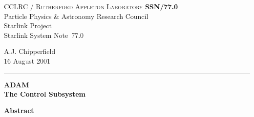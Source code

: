 \documentclass[twoside,11pt]{article}
\newcommand{\stardoccategory}  {Starlink System Note}
\newcommand{\stardocinitials}  {SSN}
\newcommand{\stardocnumber}    {77.0}
\newcommand{\stardocauthors}   {A.J. Chipperfield}
\newcommand{\stardocdate}      {16 August 2001}
\newcommand{\stardoctitle}     {ADAM\\[2ex]
                                The Control Subsystem}
\newcommand{\stardocname}{\stardocinitials /\stardocnumber}
\newenvironment{latexonly}{}{}
\renewcommand{\_}{\texttt{\symbol{95}}}
\begin{document}
\thispagestyle{empty}

\begin{latexonly}
   CCLRC / \textsc{Rutherford Appleton Laboratory} \hfill \textbf{\stardocname}\\
   {\large Particle Physics \& Astronomy Research Council}\\
   {\large Starlink Project\\}
   {\large \stardoccategory\ \stardocnumber}
   \begin{flushright}
   \stardocauthors\\
   \stardocdate
   \end{flushright}
   \vspace{-4mm}
   \rule{\textwidth}{0.5mm}
   \vspace{5mm}
   \begin{center}
   {\Large\textbf{\stardoctitle}}
   \end{center}
   \vspace{5mm}

   \vspace{10mm}
   \begin{center}
      {\Large\textbf{Abstract}}
   \end{center}
\end{latexonly}
\end{document}
